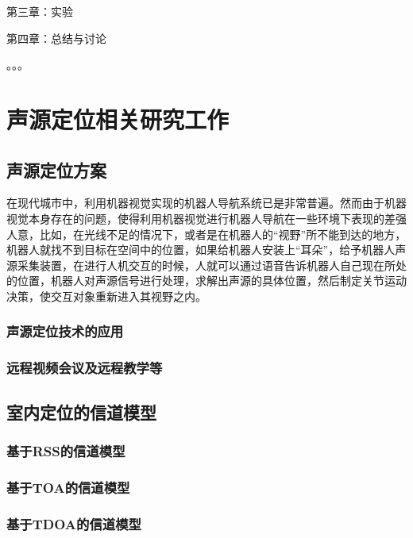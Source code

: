 \documentclass[winfonts]{njuthesis}
\begin{document}
		第三章：实验
		
		第四章：总结与讨论
		
		。。。

\chapter{声源定位相关研究工作}
	\section{声源定位方案}
	
		在现代城市中，利用机器视觉实现的机器人导航系统已是非常普遍。然而由于机器视觉本身存在的问题，使得利用机器视觉进行机器人导航在一些环境下表现的差强人意，比如，在光线不足的情况下，或者是在机器人的“视野”所不能到达的地方，机器人就找不到目标在空间中的位置，如果给机器人安装上“耳朵”，给予机器人声源采集装置，在进行人机交互的时候，人就可以通过语音告诉机器人自己现在所处的位置，机器人对声源信号进行处理，求解出声源的具体位置，然后制定关节运动决策，使交互对象重新进入其视野之内。
		
		\subsection{声源定位技术的应用}
		\subsection{远程视频会议及远程教学等}
	
	\section{室内定位的信道模型}
	
		
		
		\subsection{基于RSS的信道模型}
		
		
		
		\subsection{基于TOA的信道模型}
		
		
		
		\subsection{基于TDOA的信道模型}
		
\end{document}
